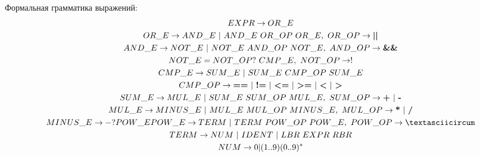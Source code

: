 \documentclass[14pt]{extarticle}
\begin{document}
Формальная грамматика выражений:
\begin{gather*}
    EXPR \to OR\_E\\
    OR\_E \to AND\_E\ |\ AND\_E\ OR\_OP\ OR\_E,\ OR\_OP \to \textbf{||}\\
    AND\_E \to NOT\_E\ |\ NOT\_E\ AND\_OP\ NOT\_E,\ AND\_OP \to \textbf{\&\&}\\
    NOT\_E = NOT\_OP ?\ CMP\_E,\ NOT\_OP \to !\\
    CMP\_E \to SUM\_E\ |\ SUM\_E\ CMP\_OP\ SUM\_E\\
    CMP\_OP \to \textbf{==}\ |\ \textbf{!=}\ |\ \textbf{<=}\ |\ \textbf{>=}\ |\
    \textbf{<}\ |\ \textbf{>}\\
    SUM\_E \to MUL\_E\ |\ SUM\_E\ SUM\_OP\ MUL\_E,\ SUM\_OP \to \textbf{+}\ |\ \textbf{-}\\
    MUL\_E \to MINUS\_E\ |\ MUL\_E\ MUL\_OP\ MINUS\_E,\ MUL\_OP \to \textbf{*}\ |\ \textbf{/}\\
    MINUS\_E \to -? POW\_E
    POW\_E \to TERM\ |\ TERM\ POW\_OP\ POW\_E,\ POW\_OP \to \textasciicircum\\
    TERM \to NUM\ |\ IDENT\ |\ LBR\ EXPR\ RBR\\
    NUM \to 0 | (1..9) (0..9)^*
\end{gather*}
\end{document}

